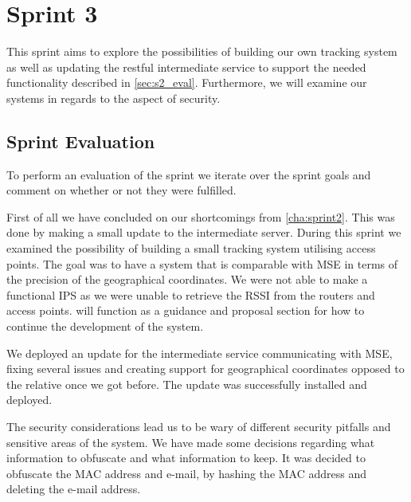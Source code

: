 \chapter{Sprint 3}\label{cha:sprint3}
This sprint aims to explore the possibilities of building our own tracking system as well as updating the restful intermediate service to support the needed functionality described in \cref{sec:s2_eval}. Furthermore, we will examine our systems in regards to the aspect of security.





\section{Sprint Evaluation}
To perform an evaluation of the sprint we iterate over the sprint goals and comment on whether or not they were fulfilled.

First of all we have concluded on our shortcomings from \cref{cha:sprint2}. This was done by making a small update to the intermediate server.
During this sprint we examined the possibility of building a small tracking system utilising access points. The goal was to have a system that is comparable with MSE in terms of the precision of the geographical coordinates. We were not able to make a functional IPS as we were unable to retrieve the RSSI from the routers and access points.  will function as a guidance and proposal section for how to continue the development of the system.

We deployed an update for the intermediate service communicating with MSE, fixing several issues and creating support for geographical coordinates opposed to the relative once we got before. The update was successfully installed and deployed.

The security considerations lead us to be wary of different security pitfalls and sensitive areas of the system. We have made some decisions regarding what information to obfuscate and what information to keep. It was decided to obfuscate the MAC address and e-mail, by hashing the MAC address and deleting the e-mail address.